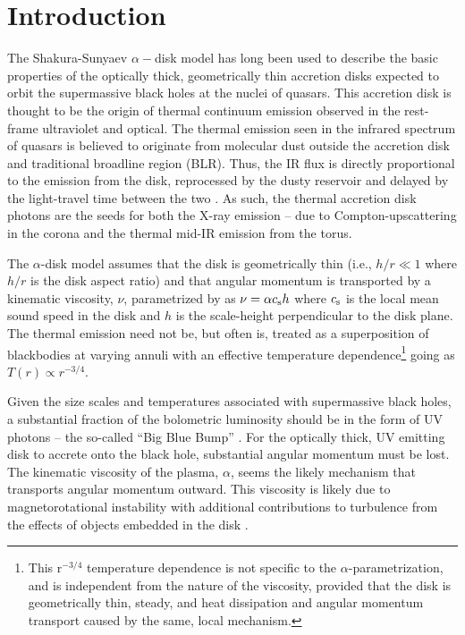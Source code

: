 \documentclass[a4paper,fleqn,usenatbib]{mnras}
\begin{document}
\section{Introduction}
The Shakura-Sunyaev $\alpha-$disk model \citep{SS73} has long been
used to describe the basic properties of the optically thick,
geometrically thin accretion disks expected to orbit the supermassive
black holes at the nuclei of quasars. This accretion disk is thought
to be the origin of thermal continuum emission observed in the
rest-frame ultraviolet and optical. The thermal emission seen in the
infrared spectrum of quasars is believed to originate from molecular
dust outside the accretion disk and traditional broadline region
(BLR). Thus, the IR flux is directly proportional to the emission from
the disk, reprocessed by the dusty reservoir and delayed by the
light-travel time between the two \citep[see e.g.,][for
reviews]{Antonucci1993, Perlman2008, Lasota2016}. As such, the thermal
accretion disk photons are the seeds for both the X-ray emission --
due to Compton-upscattering in the corona
\citep[e.g.,][]{Begelman1983, Risaliti2009, Lusso2017} and the thermal
mid-IR emission from the torus.

The $\alpha$-disk model assumes that the disk is geometrically thin
(i.e., $h/r \ll 1$ where $h/r$ is the disk aspect ratio) and that
angular momentum is transported by a kinematic viscosity, $\nu$,
parametrized by \citet{SS73} as $\nu = \alpha c_{\rm s} h$ where
$c_{\rm s}$ is the local mean sound speed in the disk and $h$ is the
scale-height perpendicular to the disk plane. The thermal emission
need not be, but often is, treated as a superposition of blackbodies
at varying annuli with an effective temperature
dependence\footnote{This r$^{-3/4}$ temperature dependence is not
specific to the $\alpha$-parametrization, and is independent from the
nature of the viscosity, provided that the disk is geometrically thin,
steady, and heat dissipation and angular momentum transport caused
by the same, local mechanism.} going as $T(r) \propto r^{-3/4}$.

Given the size scales and temperatures associated with supermassive
black holes, a substantial fraction of the bolometric luminosity
should be in the form of UV photons -- the so-called ``Big Blue Bump''
\citep{Shields1978, Malkan_Sargent1982}. For the optically thick, UV
emitting disk to accrete onto the black hole, substantial angular
momentum must be lost.  The kinematic viscosity of the plasma,
$\alpha$, seems the likely mechanism that transports angular momentum
outward.  This viscosity is likely due to magnetorotational
instability \citep[MRI; ][]{Balbus_Hawley1991} with additional
contributions to turbulence from the effects of objects embedded in
the disk \citep[e.g.,][]{McKernan2014}.
\end{document}
